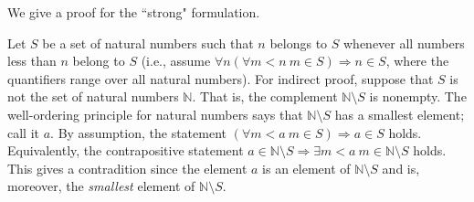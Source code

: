 \documentclass{article}
\begin{document}
We give a proof for the ``strong" formulation.

Let $S$ be a set of natural numbers such that $n$ belongs to $S$ whenever all numbers less than $n$ belong to $S$ (i.e., assume $\forall n(\forall m<n\ m\in S)\Rightarrow n\in S$, where the quantifiers range over all natural numbers). For indirect proof, suppose that $S$ is not the set of natural numbers $\mathbb{N}$. That is, the complement $\mathbb{N}\setminus S$ is nonempty.  The well-ordering principle for natural numbers says that $\mathbb{N}\setminus S$ has a smallest element; call it $a$. By assumption, the statement $(\forall m<a\ m\in S)\Rightarrow a\in S$ holds. Equivalently, the contrapositive statement $a\in \mathbb{N}\setminus S \Rightarrow \exists m<a\ m\in \mathbb{N}\setminus S$ holds. This gives a contradition since the element $a$ is an element of $\mathbb{N}\setminus S$ and is, moreover, the \emph{smallest} element of $\mathbb{N}\setminus S$.
\end{document}
